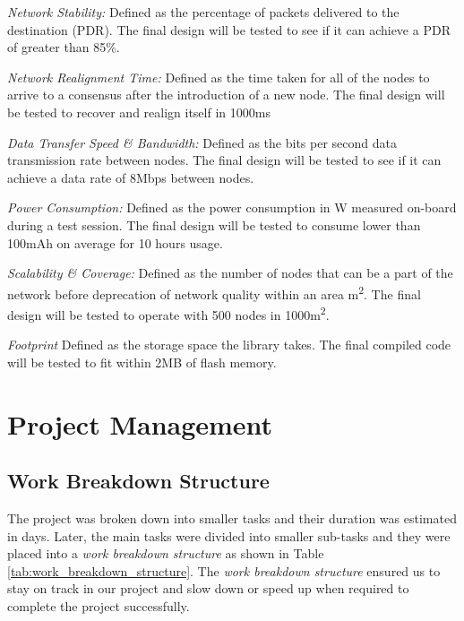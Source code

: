 \documentclass[compsoc]{IEEEtran}
\begin{document}
\textit{Network Stability:}
Defined as the percentage of packets delivered to the destination (PDR). The final design will be tested to see if it can achieve a PDR of greater than 85\%.

\textit{Network Realignment Time:}
Defined as the time taken for all of the nodes to arrive to a consensus after the introduction of a new node. The final design will be tested to recover and realign itself in 1000\si{ms}

\textit{Data Transfer Speed \& Bandwidth:}
Defined as the bits per second data transmission rate between nodes. The final design will be tested to see if it can achieve a data rate of 8\si{Mbps} between nodes.

\textit{Power Consumption:}
Defined as the power consumption in \si{W} measured on-board during a test session. The final design will be tested to consume lower than 100\si{mAh} on average for 10 hours usage.

\textit{Scalability \& Coverage:}
Defined as the number of nodes that can be a part of the network before deprecation of network quality within an area \si{m^2}. The final design will be tested to operate with 500 nodes in 1000\si{m^2}.

\textit{Footprint}
Defined as the storage space the library takes. The final compiled code will be tested to fit within 2\si{MB} of flash memory.


\newpage
\section{Project Management}
\subsection{Work Breakdown Structure}
The project was broken down into smaller tasks and their duration was estimated in days. Later, the main tasks were divided into smaller sub-tasks and they were placed into a \emph{work breakdown structure} as shown in Table \ref{tab:work_breakdown_structure}. The \emph{work breakdown structure} ensured us to stay on track in our project and slow down or speed up when required to complete the project successfully.
\end{document}
